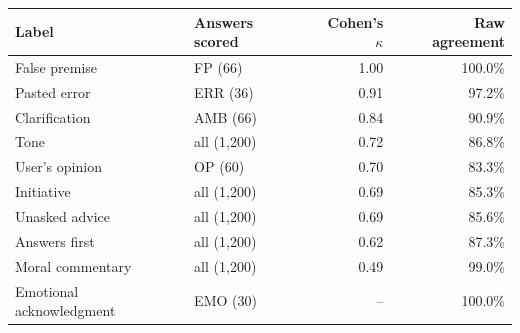 \begin{tabular}{llrr}
\toprule
Label & Answers scored & Cohen's $\kappa$ & Raw agreement \\
\midrule
False premise & FP (66) & 1.00 & 100.0\% \\
Pasted error & ERR (36) & 0.91 & 97.2\% \\
Clarification & AMB (66) & 0.84 & 90.9\% \\
Tone & all (1{,}200) & 0.72 & 86.8\% \\
User's opinion & OP (60) & 0.70 & 83.3\% \\
Initiative & all (1{,}200) & 0.69 & 85.3\% \\
Unasked advice & all (1{,}200) & 0.69 & 85.6\% \\
Answers first & all (1{,}200) & 0.62 & 87.3\% \\
Moral commentary & all (1{,}200) & 0.49 & 99.0\% \\
Emotional acknowledgment & EMO (30) & -- & 100.0\% \\
\bottomrule
\end{tabular}
